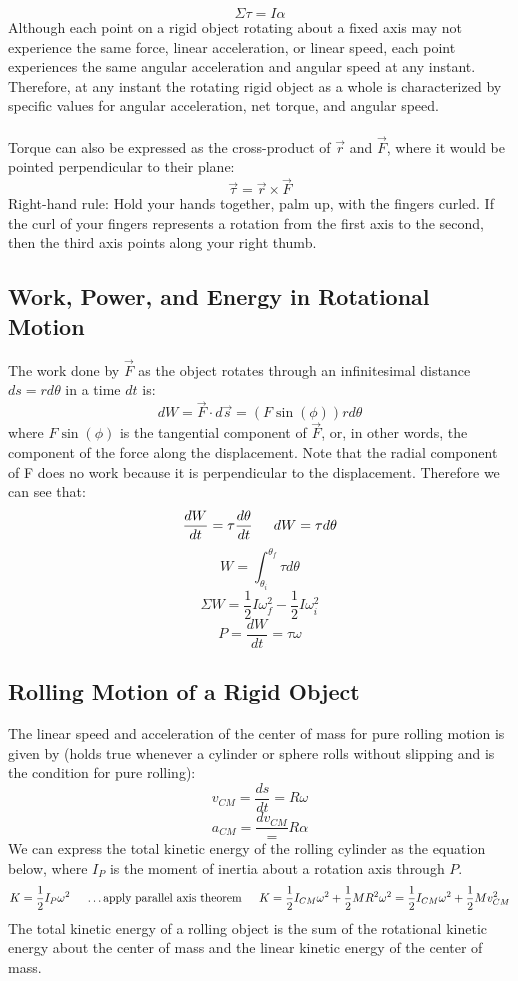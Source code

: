 \documentclass{article}
\begin{document}
\[
\Sigma\tau=I\alpha
\]
Although each point on a rigid object rotating about a fixed axis may not experience the same force, linear acceleration, or linear speed, each point experiences the same angular acceleration and angular speed at any instant. Therefore, at any instant the rotating rigid object as a whole is characterized by specific values for angular acceleration, net torque, and angular speed.\\\\
Torque can also be expressed as the cross-product of $\vec{r}$ and $\vec{F}$, where it would be pointed perpendicular to their plane:
\[
\vec{\tau}=\vec{r}\times\vec{F}
\]
Right-hand rule: Hold your hands together, palm up, with the fingers curled. If the curl of your fingers represents a rotation from the first axis to the second, then the third axis points along your right thumb.

\subsection{Work, Power, and Energy in Rotational Motion}
The work done by $\vec{F}$ as the object rotates through an infinitesimal distance $ds=rd\theta$ in a time $dt$ is:
\[
dW=\vec{F}\cdot d\vec{s}=(F\sin(\phi))rd\theta
\]
where $F\sin(\phi)$ is the tangential component of $\vec{F}$, or, in other words, the component of the force along the displacement. Note that the radial component of F does no work because it is perpendicular to the displacement. Therefore we can see that:
\[
\frac{dW}{dt}=\tau\frac{d\theta}{dt} \indent
dW=\tau d\theta
\]
\[
W=\int_{\theta_i}^{\theta_f}\tau d\theta
\]
\[
\Sigma W=\frac{1}{2}I\omega_f^2-\frac{1}{2}I\omega_i^2
\]
\[
P=\frac{dW}{dt}=\tau\omega
\]

\subsection{Rolling Motion of a Rigid Object}
The linear speed and acceleration of the center of mass for pure rolling motion is given by (holds true whenever a cylinder or sphere rolls without slipping and is the condition for pure rolling):
\[
v_{CM}=\frac{ds}{dt}=R\omega
\]
\[
a_{CM}=\frac{dv_{CM}}=R\alpha
\]
We can express the total kinetic energy of the rolling cylinder as the equation below, where $I_P$ is the moment of inertia about a rotation axis through $P$.
\[
K=\frac{1}{2}I_P\omega^2 \indent
\text{\ldots apply parallel axis theorem} \indent
K=\frac{1}{2}I_{CM}\omega^2+\frac{1}{2}MR^2\omega^2=\frac{1}{2}I_{CM}\omega^2+\frac{1}{2}Mv_{CM}^2
\]
The total kinetic energy of a rolling object is the sum of the rotational kinetic energy about the center of mass and the linear kinetic energy of the center of mass.
\end{document}
